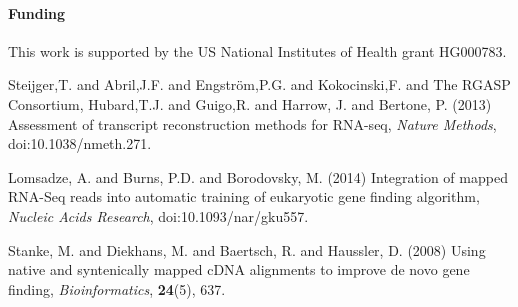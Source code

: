 \documentclass{bioinfo}
\begin{document}
\paragraph{Funding\textcolon} This work is supported by the US National Institutes of Health grant HG000783.

%
%
%
%
%
%
%
%
%


\begin{thebibliography}{}
 Steijger,T. and Abril,J.F. and Engstr\"{o}m,P.G. and Kokocinski,F. and The RGASP Consortium, Hubard,T.J. and Guigo,R. and Harrow, J. and Bertone, P. (2013) Assessment of transcript reconstruction methods for
 RNA-seq, {\it Nature Methods}, doi:10.1038/nmeth.271.

 Lomsadze, A. and Burns, P.D. and Borodovsky, M. (2014) Integration of mapped RNA-Seq reads into automatic training of eukaryotic gene finding algorithm, {\it Nucleic Acids Research}, doi:10.1093/nar/gku557.

Stanke, M. and Diekhans, M. and Baertsch, R. and Haussler, D. (2008) Using native and syntenically mapped cDNA alignments to improve de novo gene finding, \textit{Bioinformatics}, \textbf{24}(5), 637.


\end{thebibliography}
\end{document}

